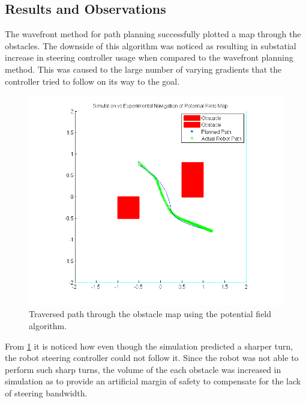 \documentclass[11pt]{article} %
\begin{document}
\subsection{Results and Observations}
The wavefront method for path planning successfully plotted a map through the obstacles.
The downside of this algorithm was noticed as resulting in substatial increase in steering controller usage
when compared to the wavefront planning method. This was caused to the large number of varying
gradients that the controller tried to follow on its way to the goal.

\begin{figure}[hbt]
 \centering
 \includegraphics[scale=0.80]{potentialFieldMapNavigation.png}
 \caption{Traversed path through the obstacle map using the potential field algorithm.}
 \label{potFieldMap}
\end{figure}

From \ref{potFieldMap} it is noticed how even though the simulation predicted a sharper turn, 
the robot steering controller could not follow it. Since the robot was not able to perform 
such sharp turns, the volume of the each obstacle was increased in simulation as to provide an artificial
margin of safety to compensate for the lack of steering bandwidth.
\end{document}

